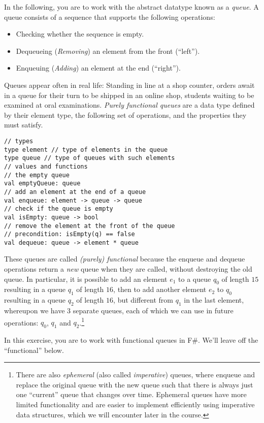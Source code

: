 In the following, you are to work with the abstract datatype known as a \emph{queue}. A queue consists of
a sequence that supports the following operations:
\begin{itemize}
\item Checking whether the sequence is empty.
\item Dequeueing (\textit{Removing}) an element from the front (``left'').
\item Enqueuing (\textit{Adding}) an element at the end (``right'').
\end{itemize}
  Queues appear often in real life: Standing in line at a shop counter, orders await in a queue for their turn to be shipped in an online shop, students waiting to be examined at oral examinations. \emph{Purely functional queues} are a data type defined by their element type, the following set of operations, and the properties they must satisfy.
\begin{lstlisting}
// types
type element // type of elements in the queue
type queue // type of queues with such elements
// values and functions
// the empty queue
val emptyQueue: queue 
// add an element at the end of a queue
val enqueue: element -> queue -> queue
// check if the queue is empty
val isEmpty: queue -> bool
// remove the element at the front of the queue
// precondition: isEmpty(q) == false
val dequeue: queue -> element * queue
\end{lstlisting}
These queues are called \emph{(purely) functional} because the enqueue and dequeue operations return a \emph{new} queue when they are called, without destroying the old queue.  In particular, it is possible to add an element $e_1$ to a queue $q_0$ of length $15$ resulting in a queue $q_1$ of length $16$, then to add another element $e_2$ to $q_0$ resulting in a queue $q_2$ of length $16$, but different from $q_1$ in the last element, whereupon we have 3 separate queues, each of which we can use in future operations: $q_0$, $q_1$ and $q_2$.\footnote{There are also \emph{ephemeral} (also called \emph{imperative}) queues, where enqueue and replace the original queue with the new queue such that there is always just one ``current'' queue that changes over time.  Ephemeral queues have more limited functionality and are easier to implement efficiently using imperative data structures, which we will encounter later in the course.} 

In this exercise, you are to work with functional queues in F\#.  We'll leave off the ``functional'' below.